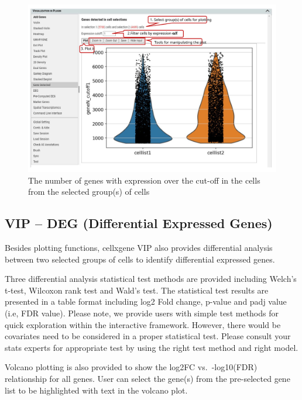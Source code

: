 \documentclass[
]{article}
\begin{document}
\begin{figure}
\centering
\includegraphics{figures/F18_label.svg}
\caption{The number of genes with expression over the cut-off in the cells from the selected group(s) of cells}
\end{figure}

\hypertarget{vip-deg-differential-expressed-genes}{%
\subsection{VIP -- DEG (Differential Expressed Genes)}\label{vip-deg-differential-expressed-genes}}

Besides plotting functions, cellxgene VIP also provides differential analysis between two selected groups of cells to identify differential expressed genes.

Three differential analysis statistical test methods are provided including Welch's t-test, Wilcoxon rank test and Wald's test. The statistical test results are presented in a table format including log2 Fold change, p-value and padj value (i.e, FDR value). Please note, we provide users with simple test methods for quick exploration within the interactive framework. However, there would be covariates need to be considered in a proper statistical test. Please consult your stats experts for appropriate test by using the right test method and right model.

Volcano plotting is also provided to show the log2FC vs.~-log10(FDR) relationship for all genes. User can select the gene(s) from the pre-selected gene list to be highlighted with text in the volcano plot.
\end{document}
